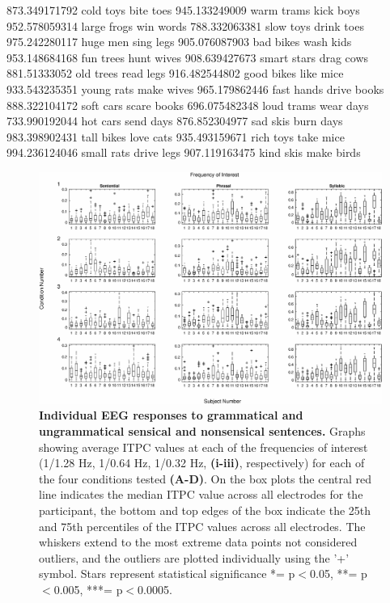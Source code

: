 \documentclass[10pt,letterpaper]{article}
\begin{document}
873.349171792	cold toys bite toes
945.133249009	warm trams kick boys
952.578059314	large frogs win words 
788.332063381	slow toys drink toes 
975.242280117	huge men sing legs 
905.076087903	bad bikes wash kids
953.148684168	fun trees hunt wives 
908.639427673	smart stars drag cows
881.51333052	old trees read legs 
916.482544802	good bikes like mice
933.543235351	young rats make wives
965.179862446	fast hands drive books 
888.322104172	soft cars scare books 
696.075482348	loud trams wear days 
733.990192044	hot cars send days 
876.852304977	sad skis burn days 
983.398902431	tall bikes love cats
935.493159671	rich toys take mice
994.236124046	small rats drive legs 
907.119163475	kind skis make birds 




\begin{figure}[tbhp]
\includegraphics[width=\linewidth]{BoxPlots_per_subject.eps}
\caption{\textbf{Individual EEG responses to grammatical and ungrammatical sensical and nonsensical sentences.} Graphs showing average ITPC values at each of the frequencies of interest (1/1.28 Hz, 1/0.64 Hz, 1/0.32 Hz, \textbf{(i-iii)}, respectively) for each of the four conditions tested \textbf{(A-D)}. On the box plots the central red line indicates the median ITPC value across all electrodes for the participant, the bottom and top edges of the box indicate the 25th and 75th percentiles of the ITPC values across all electrodes. The whiskers extend to the most extreme data points not considered outliers, and the outliers are plotted individually using the '+' symbol. Stars represent statistical significance *= p$<$0.05, **= p$<$0.005, ***= p$<$0.0005.}
\label{Fig2}
\end{figure}
\end{document}
